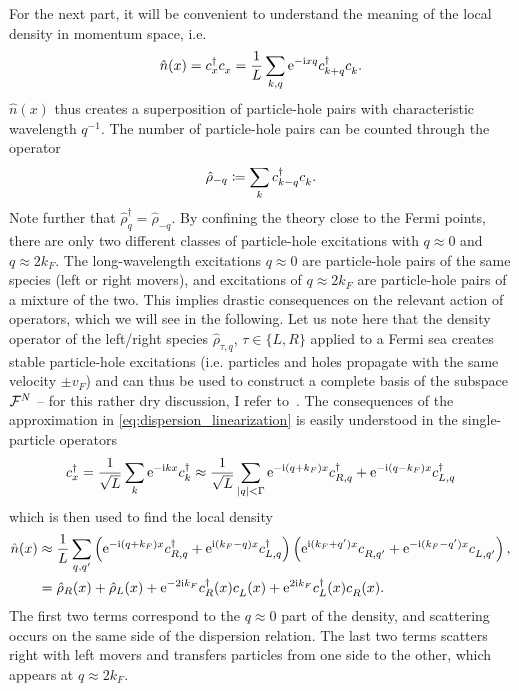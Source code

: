 For the next part, it will be convenient to understand the meaning of the local density in momentum space, i.e.
\begin{align}
    \hat n(x) = c^\dag_x c^\pdag_x = \frac1L\sum_{k,q}\re^{-\ri x q}c^\dag_{k+q}c^\pdag_{k}.
    \label{eq:local_density}
\end{align}
$\hat n(x)$ thus creates a superposition of particle-hole pairs with characteristic wavelength $q^{-1}$.
The number of particle-hole pairs can be counted through the operator
\begin{align}
    \hat \rho_{-q}\coloneqq \sum_k c^\dag_{k-q}c^\pdag_{k}.
\end{align}
Note further that $\hat\rho_q^\dag = \hat\rho_{-q}$.
By confining the theory close to the Fermi points, there are only two different classes of particle-hole excitations with $q\approx 0$ and $q\approx2k_F$.
The long-wavelength excitations $q\approx0$ are particle-hole pairs of the same species (left or right movers), and excitations of $q\approx2k_F$ are particle-hole pairs of a mixture of the two.
This implies drastic consequences on the relevant action of operators, which we will see in the following.
Let us note here that the density operator of the left/right species $\hat\rho_{\tau,q}$, $\tau\in\{L,R\}$ applied to a Fermi sea creates stable particle-hole excitations (i.e. particles and holes propagate with the same velocity $\pm v_F$) and can thus be used to construct a complete basis of the subspace $\mathcal{F}^N$ -- for this rather dry discussion, I refer to~\cite{vonDelft1998}.
The consequences of the approximation in \cref{eq:dispersion_linearization} is easily understood in the single-particle operators
\begin{align}
    c^\dag_x = \frac1{\sqrt L}\sum_k \mathrm e^{-\mathrm i k x}c^\dag_k \approx \frac1{\sqrt L}\sum_{|q|<\Gamma}\mathrm e^{-\mathrm i (q+k_F) x}c^\dag_{R, q} + \mathrm e^{-\mathrm i (q-k_F) x}c^\dag_{L, q}
\end{align}
which is then used to find the local density
\begin{align}
    \hat n(x)
    &\approx \frac1L\sum_{q,q'}\brlr{\re^{-\ri (q+k_F) x}c^\dag_{R, q} + \re^{\ri (k_F-q) x}c^\dag_{L, q}}\brlr{\re^{\ri (k_F+q') x}c^\pdag_{R, q'} + \re^{-\ri (k_F-q') x}c^\pdag_{L, q'}},
    \\
    &= \hat \rho_R(x) + \hat \rho_L(x) + \re^{-2\ri k_F}c^\dag_{R}(x)c^\pdag_{L}(x) + \re^{2\ri k_F}c^\dag_{L}(x)c^\pdag_{R}(x).
\end{align}
The first two terms correspond to the $q\approx0$ part of the density, and scattering occurs on the same side of the dispersion relation.
The last two terms scatters right with left movers and transfers particles from one side to the other, which appears at $q\approx2k_F$.
\\

